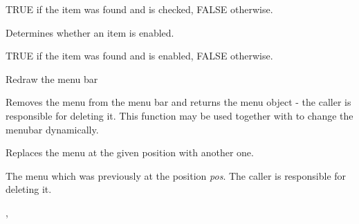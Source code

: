 
TRUE if the item was found and is checked, FALSE otherwise.

\label{wxmenubarisenabled}


Determines whether an item is enabled.




TRUE if the item was found and is enabled, FALSE otherwise.

\label{wxmenubarrefresh}


Redraw the menu bar

\label{wxmenubarremove}


Removes the menu from the menu bar and returns the menu object - the caller is
responsible for deleting it. This function may be used together with 
 to change the menubar
dynamically.



\label{wxmenubarreplace}


Replaces the menu at the given position with another one.






The menu which was previously at the position {\it pos}. The caller is
responsible for deleting it.


,\rtfsp
{}

